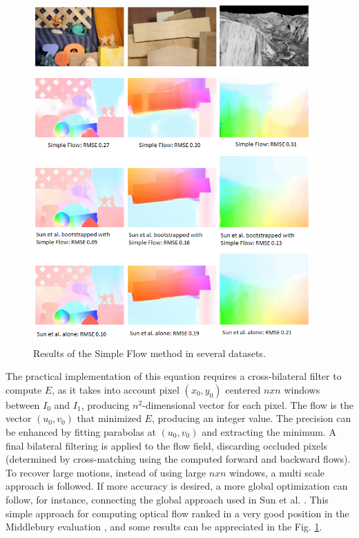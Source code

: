    \begin{figure}[bhp]
      \centering
      \includegraphics[width=0.95\textwidth]{../images/simpleoptflow.png}
      \caption{  Results of the Simple Flow method in several datasets. }
      \label{simple_of}
   \end{figure}

The practical implementation of this equation requires a cross-bilateral filter to compute $E$, as it takes into account 
pixel $(x_0,y_0)$ centered $nxn$ windows between $I_0$ and $I_1$, producing $n^2$-dimensional vector for each pixel. 
The flow is the vector $(u_0, v_0)$ that minimized $E$, producing an integer value. The precision can be enhanced by fitting 
parabolas at  $(u_0, v_0)$ and extracting the minimum. A final bilateral filtering is applied to the flow field, discarding 
occluded pixels (determined by cross-matching using the computed forward and backward flows). 
To recover large motions, instead of using large $nxn$ windows, a multi scale approach is followed. 
If more accuracy is desired, a more global optimization can follow, for instance, connecting the global approach used in Sun et al. \cite{c40}.
This simple approach for computing optical flow ranked in a very good position in the Middlebury evaluation \cite{c17}, 
and some results can be appreciated in the Fig. \ref{simple_of}.



